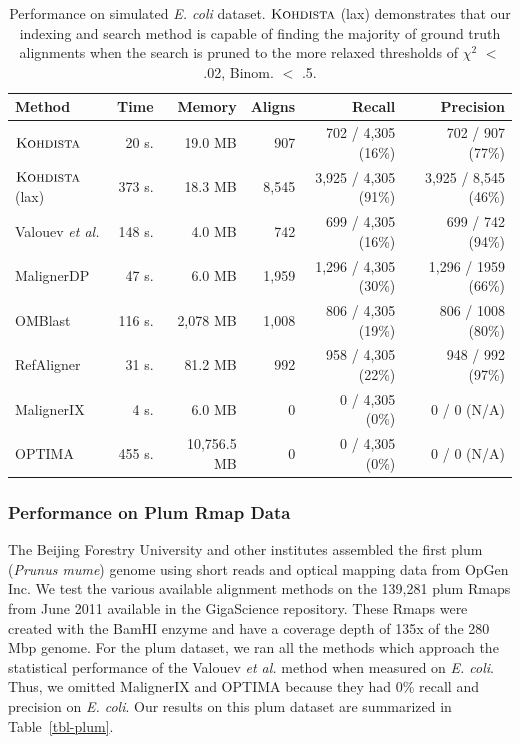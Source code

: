 \begin{table}[h]
\caption{Performance on simulated {\it E. coli} dataset.  $\mbox{\rm \textsc{Kohdista}}$ (lax) demonstrates that our indexing and search method is capable of finding the majority of ground truth alignments when the search is pruned to the more relaxed thresholds of $\chi^2$  $<$ .02, Binom. $<$ .5.}
\centering
\begin{tabular}{|l|r|r|r|r|r|} %
  \hline
{\bf Method}	& {\bf Time}		& {\bf Memory} 	& {\bf Aligns } & {\bf Recall} & {\bf Precision}\\
\hline
\hline
$\mbox{\rm \textsc{Kohdista}}$     	 	& 20 s.		& 19.0 MB & 907 & 702 / 4,305  (16\%) & 702 / 907 (77\%)\\
$\mbox{\rm \textsc{Kohdista}}$ (lax)    	 	& 373 s. 		& 18.3 MB & 8,545	& 3,925 / 4,305 (91\%) & 3,925 / 8,545 (46\%)\\ 	Valouev {\it et al.} 		& 148 s. 	& 4.0 MB		&  742 & 699 / 4,305 (16\%)  & 699 / 742 (94\%) \\
MalignerDP          & 47 s.     & 6.0 MB        & 1,959 & 1,296 / 4,305 (30\%) & 1,296 / 1959 (66\%)\\
OMBlast             & 116 s.    & 2,078 MB      &  1,008 & 806 / 4,305 (19\%) & 806 / 1008 (80\%) \\
RefAligner          & 31 s.     & 81.2 MB         &   992   & 958 / 4,305 (22\%) & 948 / 992 (97\%) \\
MalignerIX          & 4 s.         & 6.0 MB       & 0 & 0 / 4,305 (0\%) & 0 / 0 (N/A) \\
  OPTIMA              & 455 s.     & 10,756.5 MB       & 0  & 0 / 4,305 (0\%)  & 0 / 0 (N/A) \\
  \hline


\end{tabular}
\label{tbl-ecoli}
\end{table}



\subsubsection{Performance on Plum Rmap Data}
\label{section:plum}

The Beijing Forestry University and other institutes assembled the first plum ({\em Prunus mume}) genome using short reads and optical mapping data from OpGen Inc.   We test the various available alignment methods on the 139,281 plum Rmaps from June 2011 available in the GigaScience repository.  These Rmaps were created with the BamHI enzyme and have a coverage depth of 135x of the 280 Mbp genome. For the plum dataset, we ran all the methods which approach the statistical performance of the Valouev {\it et al.} method when measured on {\it E. coli}.  Thus, we omitted MalignerIX and OPTIMA because they had 0\% recall and precision on {\it E. coli}.  Our results on this plum dataset are summarized in Table~\ref{tbl-plum}.


